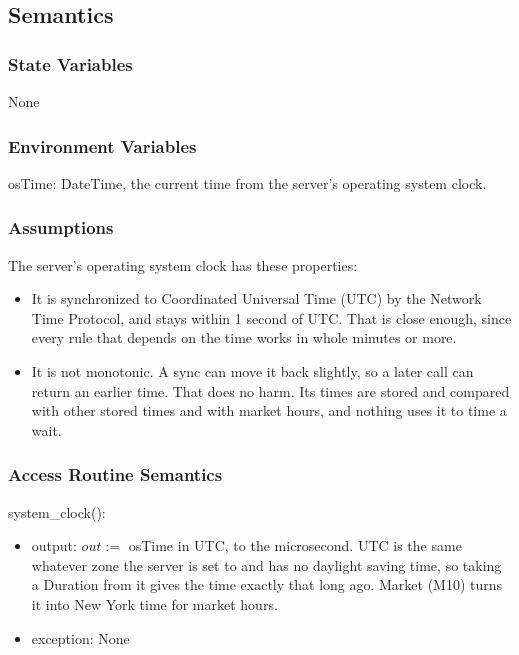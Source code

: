 \documentclass[12pt, titlepage]{article}
\begin{document}
\subsection{Semantics}

\subsubsection{State Variables}

None

\subsubsection{Environment Variables}

osTime: DateTime, the current time from the server's operating system clock.

\subsubsection{Assumptions}

The server's operating system clock has these properties:
\begin{itemize}
\item It is synchronized to Coordinated Universal Time (UTC) by the Network
  Time Protocol, and stays within 1 second of UTC. That is close enough, since
  every rule that depends on the time works in whole minutes or more.
\item It is not monotonic. A sync can move it back slightly, so a later call
  can return an earlier time. That does no harm. Its times are stored and
  compared with other stored times and with market hours, and nothing uses it
  to time a wait.
\end{itemize}

\subsubsection{Access Routine Semantics}

\noindent system\_clock():
\begin{itemize}
\item output: $out := $ osTime in UTC, to the microsecond. UTC is the same
  whatever zone the server is set to and has no daylight saving time, so
  taking a Duration from it gives the time exactly that long ago. Market (M10)
  turns it into New York time for market hours.
\item exception: None
\end{itemize}
\end{document}
